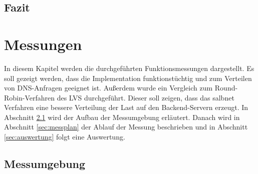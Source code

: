 \documentclass[a4paper, 12pt, BCOR10mm, DIV12, toc=bibliography, toc=listof, german]{scrbook}
\begin{document}
		
		

		

		
			

		\section{Fazit} %
		\label{sec:implementierung-fazit}
		


	\chapter{Messungen} %
	\label{cha:messungen}

		In diesem Kapitel werden die durchgeführten Funktionsmessungen dargestellt. Es soll gezeigt
		werden, dass die Implementation funktionstüchtig und zum Verteilen von DNS-Anfragen geeignet
		ist. Außerdem wurde ein Vergleich zum Round-Robin-Verfahren des LVS durchgeführt. Dieser soll
		zeigen, dass das salbnet Verfahren eine bessere Verteilung der Last auf den Backend-Servern
		erzeugt. In Abschnitt \ref{sec:messumgebung} wird der Aufbau der Messumgebung erläutert. Danach
		wird in Abschnitt \ref{sec:messplan} der Ablauf der Messung beschrieben und in Abschnitt
		\ref{sec:auswertung} folgt eine Auswertung.

		\section{Messumgebung} %
		\label{sec:messumgebung}
\end{document}
